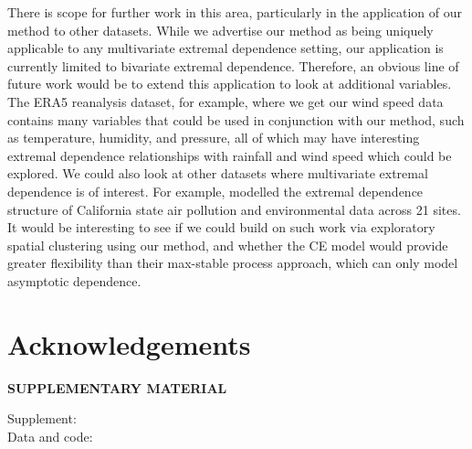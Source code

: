 \documentclass[12pt]{article}
\begin{document}
There is scope for further work in this area, particularly in the application of our method to other datasets.
While we advertise our method as being uniquely applicable to any multivariate extremal dependence setting, our application is currently limited to bivariate extremal dependence.
Therefore, an obvious line of future work would be to extend this application to look at additional variables. 
The ERA5 reanalysis dataset, for example, where we get our wind speed data contains many variables that could be used in conjunction with our method, such as temperature, humidity, and pressure, all of which may have interesting extremal dependence relationships with rainfall and wind speed which could be explored.
We could also look at other datasets where multivariate extremal dependence is of interest. 
For example, \citet{Vettori2020} modelled the extremal dependence structure of California state air pollution and environmental data across 21 sites. 
It would be interesting to see if we could build on such work via exploratory spatial clustering using our method, and whether the CE model would provide greater flexibility than their max-stable process approach, which can only model asymptotic dependence. 




\section*{Acknowledgements}


\bigskip
\begin{center}
{\large\bf SUPPLEMENTARY MATERIAL}
\end{center}

\begin{description}

\item[Supplement:] 

\item[Data and code:] 

\end{description}



{\small

}
\end{document}

